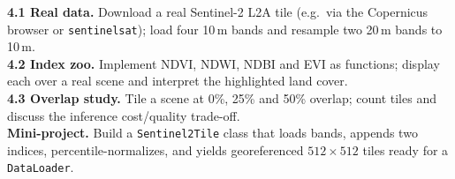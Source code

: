 \begin{exbox}
\textbf{4.1 Real data.} Download a real Sentinel-2 L2A tile (e.g.\ via the
Copernicus browser or \texttt{sentinelsat}); load four 10\,m bands and resample
two 20\,m bands to 10\,m.\\[2pt]
\textbf{4.2 Index zoo.} Implement NDVI, NDWI, NDBI and EVI as functions; display
each over a real scene and interpret the highlighted land cover.\\[2pt]
\textbf{4.3 Overlap study.} Tile a scene at 0\%, 25\% and 50\% overlap; count
tiles and discuss the inference cost/quality trade-off.\\[2pt]
\textbf{Mini-project.} Build a \texttt{Sentinel2Tile} class that loads bands,
appends two indices, percentile-normalizes, and yields georeferenced
$512\times512$ tiles ready for a \texttt{DataLoader}.
\end{exbox}
